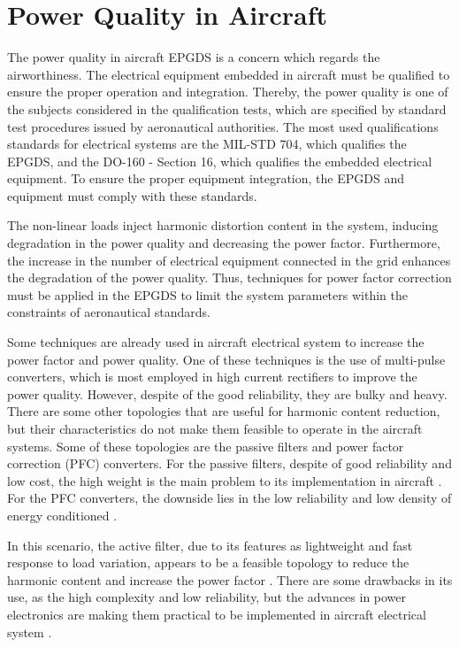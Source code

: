 \section{Power Quality in Aircraft}\label{sec:Power_Quality}

The power quality in aircraft EPGDS is a concern which regards the airworthiness. The electrical equipment embedded in aircraft must be qualified to ensure the proper operation and integration. Thereby, the power quality is one of the subjects considered in the qualification tests, which are specified by standard test procedures issued by aeronautical authorities. The most used qualifications standards for electrical systems are the MIL-STD 704, which qualifies the EPGDS, and the DO-160 - Section 16, which qualifies the embedded electrical equipment. To ensure the proper equipment integration, the EPGDS and equipment must comply with these standards.

The non-linear loads inject harmonic distortion content in the system, inducing degradation in the power quality and decreasing the power factor. Furthermore, the increase in the number of electrical equipment connected in the grid enhances the degradation of the power quality. Thus, techniques for power factor correction must be applied in the EPGDS to limit the system parameters within the constraints of aeronautical standards.

Some techniques are already used in aircraft electrical system to increase the power factor and power quality. One of these techniques is the use of multi-pulse converters, which is most employed in high current rectifiers to improve the power quality. However, despite of the good reliability, they are bulky and heavy. There are some other topologies that are useful for harmonic content reduction, but their characteristics do not make them feasible to operate in the aircraft systems. Some of these topologies are the passive filters and power factor correction (PFC) converters. For the passive filters, despite of good reliability and low cost, the high weight is the main problem to its implementation in aircraft \citep{Barruel2004}. For the PFC converters, the downside lies in the low reliability and low density of energy conditioned \citep{Zhu2014,Gong2003,Lobo2005}. 

In this scenario, the active filter, due to its features as lightweight and fast response to load variation, appears to be a feasible topology to reduce the harmonic content and increase the power factor \citep{Zhu2014,Chen2012control,Karatzaferis2013}. There are some drawbacks in its use, as the high complexity and low reliability, but the advances in power electronics are making them practical to be implemented in aircraft electrical system \citep{Abdelhafez2009}.
